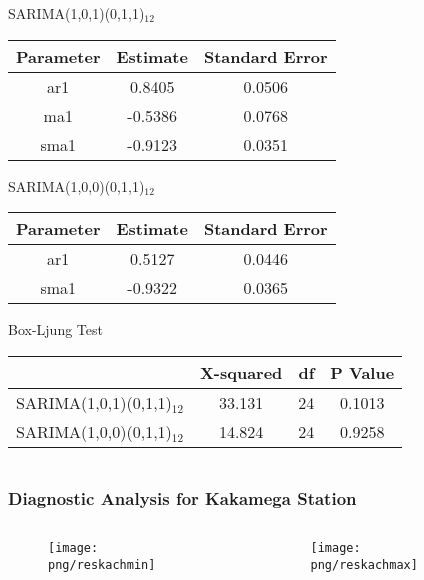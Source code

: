\documentclass[]{beamer}
\begin{document}
\begin{frame}
\begin{columns}
\begin{column}{.25\textwidth}
\begin{table}[h!]
				\begin{center}
					SARIMA(1,0,1)(0,1,1)$_{12}$\\
					\begin{tabular}{c| c| c}
						\hline
						Parameter &Estimate & Standard Error\\
						\hline
						ar1 & 0.8405 & 0.0506 \\
						ma1 & -0.5386 & 0.0768 \\
						sma1 & -0.9123 & 0.0351 \\
						\hline
					\end{tabular}
				\end{center}
			\end{table}
			\begin{table}[h!]
			\begin{center}
				SARIMA(1,0,0)(0,1,1)$_{12}$\\
				\begin{tabular}{c| c| c}
					\hline
					Parameter &Estimate &Standard Error\\
					\hline
					ar1 & 0.5127 & 0.0446 \\
					sma1 & -0.9322 & 0.0365 \\
					\hline
				\end{tabular}
			\end{center}
			\end{table}
		\begin{table}[h!]
			\begin{center}
				Box-Ljung Test\\
				\begin{tabular}{c c c c}
					\hline
					& X-squared & df & P Value\\
					\hline
					SARIMA(1,0,1)(0,1,1)$_{12}$	& 33.131 & 24 & 0.1013\\
					SARIMA(1,0,0)(0,1,1)$_{12}$	& 14.824 & 24 & 0.9258\\
					\hline
				\end{tabular}
			\end{center}
		\end{table}
		\end{column}
	\end{columns}
\end{frame}

\begin{frame}
	\frametitle{Diagnostic Analysis for Kakamega Station}
	\fontsize{5pt}{7.2}\selectfont
	\begin{columns}
		\hspace*{-2cm}
		\begin{column}[c]{4cm}
			\begin{figure}
				\texttt{[image: png/reskachmin]}
			\end{figure}
		\end{column}
		\begin{column}[c]{4cm}
			\begin{figure}
				\texttt{[image: png/reskachmax]}
			\end{figure}
		\end{column}
	\end{columns}
\end{frame}
\end{document}
